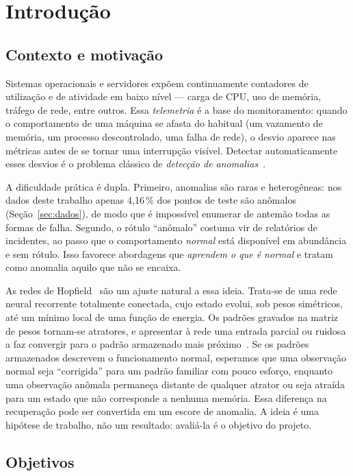 \section{Introdução}\label{sec:intro}

\subsection{Contexto e motivação}
Sistemas operacionais e servidores expõem continuamente contadores de utilização e de atividade em baixo
nível --- carga de CPU, uso de memória, tráfego de rede, entre outros. Essa \emph{telemetria} é a base do
monitoramento: quando o comportamento de uma máquina se afasta do habitual (um vazamento de memória, um
processo descontrolado, uma falha de rede), o desvio aparece nas métricas antes de se tornar uma
interrupção visível. Detectar automaticamente esses desvios é o problema clássico de \emph{detecção de
anomalias}~\cite{chandola2009}.

A dificuldade prática é dupla. Primeiro, anomalias são raras e heterogêneas: nos dados deste trabalho
apenas 4,16\,\% dos pontos de teste são anômalos (Seção~\ref{sec:dados}), de modo que é impossível
enumerar de antemão todas as formas de falha. Segundo, o rótulo ``anômalo'' costuma vir de relatórios de
incidentes, ao passo que o comportamento \emph{normal} está disponível em abundância e sem rótulo. Isso
favorece abordagens que \emph{aprendem o que é normal} e tratam como anomalia aquilo que não se encaixa.

As redes de Hopfield~\cite{hopfield1982} são um ajuste natural a essa ideia. Trata-se de uma rede neural
recorrente totalmente conectada, cujo estado evolui, sob pesos simétricos, até um mínimo local de uma função
de energia. Os padrões gravados na matriz de pesos tornam-se atratores, e apresentar à rede uma entrada
parcial ou ruidosa a faz convergir para o padrão armazenado mais próximo~\cite{hopfieldtank1985}. Se os
padrões armazenados descrevem o funcionamento normal, esperamos que uma observação normal seja
``corrigida'' para um padrão familiar com pouco esforço, enquanto uma observação anômala permaneça distante
de qualquer atrator ou seja atraída para um estado que não corresponde a nenhuma memória. Essa diferença na
recuperação pode ser convertida em um escore de anomalia. A ideia é uma hipótese de trabalho, não um
resultado: avaliá-la é o objetivo do projeto.

\subsection{Objetivos}
